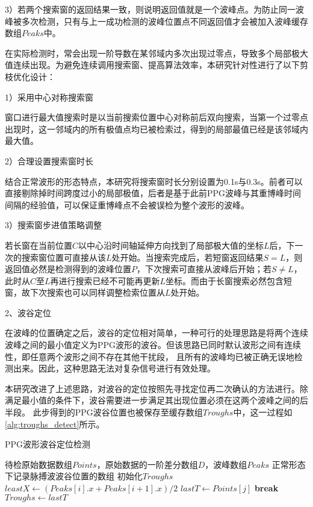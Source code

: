 3）若两个搜索窗的返回结果一致，则说明返回值就是一个波峰点。为防止同一波峰被多次检测，只有与上一成功检测的波峰位置点不同返回值才会被加入波峰缓存数组$Peaks$中。

在实际检测时，常会出现一阶导数在某邻域内多次出现过零点，导致多个局部极大值连续出现。为避免连续调用搜索窗、提高算法效率，本研究针对性进行了以下剪枝优化设计：

1）采用中心对称搜索窗

窗口进行最大值搜索时是以当前搜索位置中心对称前后双向搜索，当第一个过零点出现时，这一邻域内的所有极值点均已被检索过，得到的局部最值已经是该邻域内最大值。

2）合理设置搜索窗时长

结合正常波形的形态特点，本研究将搜索窗时长分别设置为0.1s与0.3s。前者可以直接剔除掉时间跨度过小的局部极值，后者是基于此前PPG波峰与其重博峰时间间隔的经验值，可以保证重博峰点不会被误检为整个波形的波峰。

3）搜索窗步进值策略调整

若长窗在当前位置$C$以中心沿时间轴延伸方向找到了局部极大值的坐标$L$后，下一次的搜索窗位置可直接从该$L$处开始。当搜索完成后，若短窗返回结果$S=L$，则返回值必然是检测得到的波峰位置$P$，下次搜索可直接从波峰后开始；若$S\ne L$，
此时从$C$至$L$再进行搜索已经不可能再更新$L$坐标。而由于长窗搜索必然包含短窗，故下次搜索也可以同样调整检索位置从$L$处开始。

2、波谷定位

在波峰的位置确定之后，波谷的定位相对简单，一种可行的处理思路是将两个连续波峰之间的最小值定义为PPG波形的波谷。但该思路已同时默认波形之间有连续性，即任意两个波形之间不存在其他干扰段，
且所有的波峰均已被正确无误地检测出来。因此，这种思路无法对复杂信号进行有效处理。

本研究改进了上述思路，对波谷的定位按照先寻找定位再二次确认的方法进行。除满足最小值的条件下，波谷需要进一步满足其出现位置必须在这两个波峰之间的后半段。
此步得到的PPG波谷位置也被保存至缓存数组$Troughs$中，这一过程如\autoref{alg:troughs_detect}所示。
\begin{breakablealgorithm}
    \caption{PPG波形波谷定位检测}
    \label{alg:troughs_detect}
    \begin{algorithmic}[1] %
        \Require 待检原始数据数组$Points$，原始数据的一阶差分数组$D$，波峰数组$Peaks$
        \Ensure 正常形态下记录脉搏波波谷位置的数组
            \State 初始化$Troughs$
                \State $leastX \gets (Peaks[i].x + Peaks[i+1].x )/2$
                            \State $lastT \gets Points[j]$
                            \State \textbf{break}
                        \EndIf
                    \EndFor
                \State $Troughs \gets lastT$
            \EndFor
            \State {}
        \EndFunction
    \end{algorithmic}
\end{breakablealgorithm}

